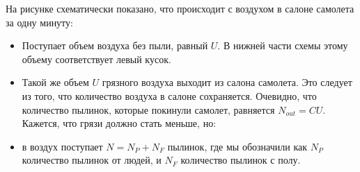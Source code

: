 На рисунке схематически показано, что происходит с воздухом в салоне самолета за одну минуту:
\begin{itemize}
\item Поступает объем воздуха без пыли, равный $U$. В нижней части схемы этому объему соответствует левый кусок.
\item Такой же объем $U$ грязного воздуха выходит из салона самолета. Это следует из того, что количество воздуха в салоне сохраняется. Очевидно, что количество пылинок, которые покинули самолет, равняется $N_{out} = C U$. Кажется, что грязи должно стать меньше, но:
\item в воздух поступает $N = N_P + N_F$ пылинок, где мы обозначили как $N_P$ количество пылинок от людей, и $N_F$ количество пылинок с полу.
\end{itemize}

\begin{center}
\end{center}

